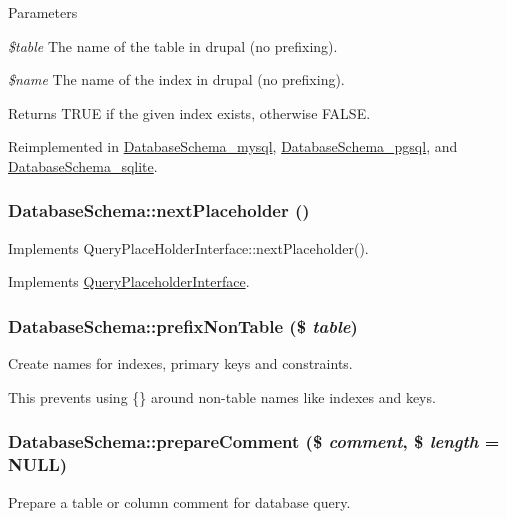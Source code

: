 \begin{DoxyParams}{Parameters}
\item[{\em \$table}]The name of the table in drupal (no prefixing). \item[{\em \$name}]The name of the index in drupal (no prefixing).\end{DoxyParams}
\begin{DoxyReturn}{Returns}
TRUE if the given index exists, otherwise FALSE. 
\end{DoxyReturn}


Reimplemented in \hyperlink{classDatabaseSchema__mysql_aeef6ccd88482787cdbb4ff4e65bed2dd}{DatabaseSchema\_\-mysql}, \hyperlink{classDatabaseSchema__pgsql_aee7c3f672034280888fd9533a7c98835}{DatabaseSchema\_\-pgsql}, and \hyperlink{classDatabaseSchema__sqlite_ac3f44b37b0b2d08a47433b5b4120aa6b}{DatabaseSchema\_\-sqlite}.\hypertarget{classDatabaseSchema_a25bdbd4eb743fcd4db4809451ad5e8c9}{
\subsubsection[{nextPlaceholder}]{\setlength{\rightskip}{0pt plus 5cm}DatabaseSchema::nextPlaceholder ()}}
\label{classDatabaseSchema_a25bdbd4eb743fcd4db4809451ad5e8c9}
Implements QueryPlaceHolderInterface::nextPlaceholder(). 

Implements \hyperlink{interfaceQueryPlaceholderInterface_a6ec3008deb25380042178419cc601b37}{QueryPlaceholderInterface}.\hypertarget{classDatabaseSchema_a6ed5776d1fdc2790123dd5e03571ba77}{
\subsubsection[{prefixNonTable}]{\setlength{\rightskip}{0pt plus 5cm}DatabaseSchema::prefixNonTable (\$ {\em table})}}
\label{classDatabaseSchema_a6ed5776d1fdc2790123dd5e03571ba77}
Create names for indexes, primary keys and constraints.

This prevents using \{\} around non-\/table names like indexes and keys. \hypertarget{classDatabaseSchema_a45f043158682052792524ab48a188dc5}{
\subsubsection[{prepareComment}]{\setlength{\rightskip}{0pt plus 5cm}DatabaseSchema::prepareComment (\$ {\em comment}, \/  \$ {\em length} = {\ttfamily NULL})}}
\label{classDatabaseSchema_a45f043158682052792524ab48a188dc5}
Prepare a table or column comment for database query.


